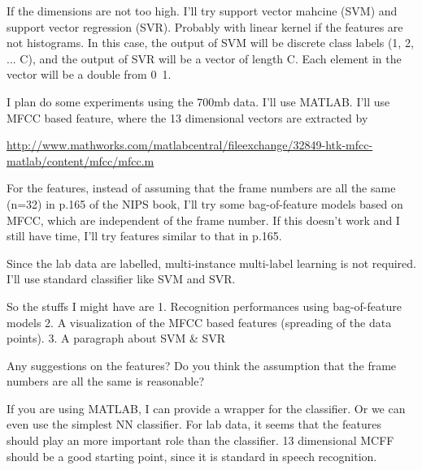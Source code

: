 If the dimensions are not too high.
I'll try support vector mahcine (SVM) and support vector regression (SVR).
Probably with linear kernel if the features are not histograms.
In this case, the output of SVM will be discrete class labels (1, 2, ... C),
and the output of SVR will be a vector of length C. Each element in the
vector will be a double from 0~1.


I plan do some experiments using the 700mb data.
I'll use MATLAB.
I'll use MFCC based feature, where the 13 dimensional vectors are
extracted by

\url{http://www.mathworks.com/matlabcentral/fileexchange/32849-htk-mfcc-matlab/content/mfcc/mfcc.m}

For the features, instead of assuming that the frame numbers are all the
same (n=32) in p.165 of the NIPS book, I'll try some bag-of-feature models
based on MFCC, which are independent of the frame number. If this doesn't
work and I still have time, I'll try features similar to that in p.165.

Since the lab data are labelled, multi-instance multi-label learning is
not required. I'll use standard classifier like SVM and SVR.

So the stuffs I might have are
1. Recognition performances using bag-of-feature models
2. A visualization of the MFCC based features (spreading of the data points).
3. A paragraph about SVM \& SVR

Any suggestions on the features? Do you think the assumption that the
frame numbers are all the same is reasonable?

If you are using MATLAB, I can provide a wrapper for the classifier. Or we
can even use the simplest NN classifier.
For lab data, it seems that the features should play an more important
role than the classifier.
13 dimensional MCFF should be a good starting point, since it is standard
in speech recognition.
